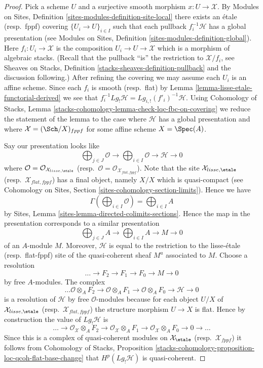 \begin{proof}
Pick a scheme $U$ and a surjective smooth morphism $x : U \to \mathcal{X}$. By
Modules on Sites, Definition \ref{sites-modules-definition-site-local}
there exists an \'etale (resp.\ fppf) covering
$\{U_i \to U\}_{i \in I}$ such that each pullback $f_i^{-1}\mathcal{H}$
has a global presentation (see
Modules on Sites, Definition \ref{sites-modules-definition-global}).
Here $f_i : U_i \to \mathcal{X}$ is the composition
$U_i \to U \to \mathcal{X}$ which is a morphism of algebraic stacks.
(Recall that the pullback ``is'' the restriction to $\mathcal{X}/f_i$, see
Sheaves on Stacks, Definition \ref{stacks-sheaves-definition-pullback}
and the discussion following.)
After refining the covering we may assume each $U_i$ is an affine scheme.
Since each $f_i$ is smooth (resp.\ flat) by
Lemma \ref{lemma-lisse-etale-functorial-derived}
we see that $f_i^{-1}Lg_!\mathcal{H} = Lg_{i, !}(f'_i)^{-1}\mathcal{H}$.
Using
Cohomology of Stacks,
Lemma \ref{stacks-cohomology-lemma-check-lqc-fbc-on-covering}
we reduce the statement of the lemma to the case where $\mathcal{H}$
has a global presentation and where $\mathcal{X} = (\Sch/X)_{fppf}$
for some affine scheme $X = \Spec(A)$.

\medskip\noindent
Say our presentation looks like
$$
\bigoplus\nolimits_{j \in J} \mathcal{O} \longrightarrow
\bigoplus\nolimits_{i \in I} \mathcal{O} \longrightarrow
\mathcal{H} \longrightarrow 0
$$
where $\mathcal{O} = \mathcal{O}_{\mathcal{X}_{lisse,\etale}}$
(resp.\ $\mathcal{O} = \mathcal{O}_{\mathcal{X}_{flat,fppf}}$).
Note that the site $\mathcal{X}_{lisse,\etale}$
(resp.\ $\mathcal{X}_{flat,fppf}$) has a final object, namely
$X/X$ which is quasi-compact (see
Cohomology on Sites, Section \ref{sites-cohomology-section-limits}).
Hence we have
$$
\Gamma(\bigoplus\nolimits_{i \in I} \mathcal{O}) =
\bigoplus\nolimits_{i \in I} A
$$
by Sites, Lemma \ref{sites-lemma-directed-colimits-sections}. Hence the map
in the presentation corresponds to a similar presentation
$$
\bigoplus\nolimits_{j \in J} A \longrightarrow
\bigoplus\nolimits_{i \in I} A \longrightarrow
M \longrightarrow 0
$$
of an $A$-module $M$. Moreover, $\mathcal{H}$ is equal to the restriction
to the lisse-\'etale (resp.\ flat-fppf) site of the quasi-coherent sheaf
$M^a$ associated to $M$. Choose a resolution
$$
\ldots \to F_2 \to F_1 \to F_0 \to M \to 0
$$
by free $A$-modules. The complex
$$
\ldots \mathcal{O} \otimes_A F_2 \to \mathcal{O} \otimes_A F_1 \to
\mathcal{O} \otimes_A F_0 \to \mathcal{H} \to 0
$$
is a resolution of $\mathcal{H}$ by free $\mathcal{O}$-modules because
for each object $U/X$ of $\mathcal{X}_{lisse,\etale}$
(resp.\ $\mathcal{X}_{flat,fppf}$) the structure morphism $U \to X$
is flat. Hence by construction the value of $Lg_!\mathcal{H}$ is
$$
\ldots \to
\mathcal{O}_\mathcal{X} \otimes_A F_2 \to
\mathcal{O}_\mathcal{X} \otimes_A F_1 \to
\mathcal{O}_\mathcal{X} \otimes_A F_0 \to 0 \to \ldots
$$
Since this is a complex of quasi-coherent modules on
$\mathcal{X}_\etale$ (resp.\ $\mathcal{X}_{fppf}$)
it follows from
Cohomology of Stacks,
Proposition \ref{stacks-cohomology-proposition-loc-qcoh-flat-base-change}
that $H^p(Lg_!\mathcal{H})$ is quasi-coherent.
\end{proof}




